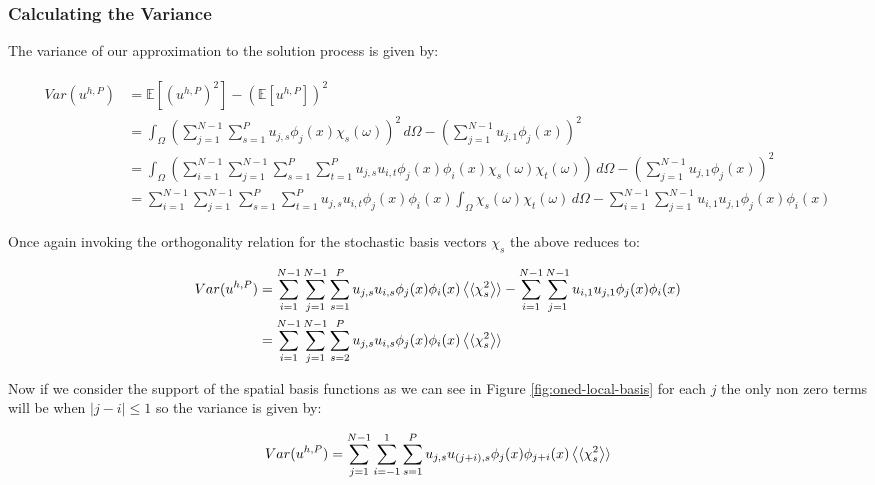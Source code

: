 \subsubsection{Calculating the Variance}

The variance of our approximation to the solution process is given by:

\begin{align}
  \begin{split}
    Var(u^{h,P}) &= \mathbb{E}\left[\left(u^{h,P}\right)^2\right]
                    - \left(\mathbb{E}\left[u^{h,P}\right]\right)^2 \\
      &= \int_\Omega\left(\sum_{j=1}^{N - 1}\sum_{s=1}^Pu_{j,s}\phi_j(x)\chi_s(\omega)\right)^2\, d\Omega
        - \left(\sum_{j=1}^{N - 1}u_{j,1}\phi_j(x)\right)^2 \\
      &= \int_\Omega\left(\sum_{i=1}^{N - 1}\sum_{j=1}^{N - 1}\sum_{s=1}^P\sum_{t=1}^P
           u_{j,s}u_{i,t}\phi_j(x)\phi_i(x)\chi_s(\omega)\chi_t(\omega)
         \right)\, d\Omega - \left(\sum_{j=1}^{N - 1}u_{j,1}\phi_j(x)\right)^2 \\
      &= \sum_{i=1}^{N - 1}\sum_{j=1}^{N - 1}\sum_{s=1}^P\sum_{t=1}^Pu_{j,s}u_{i,t}
            \phi_j(x)\phi_i(x)\int_\Omega\chi_s(\omega)\chi_t(\omega)\, d\Omega
            - \sum_{i=1}^{N - 1}\sum_{j=1}^{N - 1}u_{i,1}u_{j,1}\phi_j(x)\phi_i(x)
  \end{split}
\end{align}

Once again invoking the orthogonality relation for the stochastic basis vectors
$\chi_s$ the above reduces to:

\begin{align}
  \begin{split}
    Var(u^{h,P}) &= \sum_{i=1}^{N - 1}\sum_{j=1}^{N - 1}\sum_{s=1}^P
      u_{j,s}u_{i,s}\phi_j(x)\phi_i(x)\left\langle\langle\chi_s^2\right\rangle\rangle
            - \sum_{i=1}^{N - 1}\sum_{j=1}^{N-1}u_{i,1}u_{j,1}\phi_j(x)\phi_i(x) \\
      &= \sum_{i=1}^{N-1}\sum_{j=1}^{N-1}\sum_{s=2}^P
            u_{j,s}u_{i,s}\phi_j(x)\phi_i(x)\left\langle\langle\chi_s^2\right\rangle\rangle
  \end{split}
\end{align}

Now if we consider the support of the spatial basis functions as we can see in
Figure \ref{fig:oned-local-basis} for each $j$ the only non zero terms will be
when $|j - i| \leq 1$ so the variance is given by:

\begin{equation}
    Var(u^{h,P})= \sum_{j=1}^{N-1}\sum_{i=-1}^1\sum_{s=1}^P
      u_{j,s}u_{(j+i),s}\phi_j(x)\phi_{j+i}(x)\left\langle\langle\chi_s^2\right\rangle\rangle
\end{equation}

